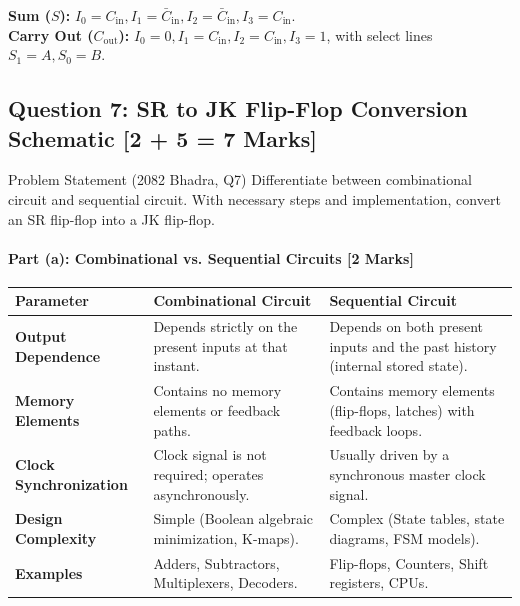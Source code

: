 \documentclass[11pt,a4paper,oneside]{book}
\begin{document}
\begin{answerbox}
\textbf{Sum ($S$):} $I_0 = C_{\text{in}}, I_1 = \bar{C}_{\text{in}}, I_2 = \bar{C}_{\text{in}}, I_3 = C_{\text{in}}$.\\
\textbf{Carry Out ($C_{\text{out}}$):} $I_0 = 0, I_1 = C_{\text{in}}, I_2 = C_{\text{in}}, I_3 = 1$, with select lines $S_1 = A, S_0 = B$.
\end{answerbox}

\vspace{0.6cm}

\subsection{Question 7: SR to JK Flip-Flop Conversion Schematic [2 + 5 = 7 Marks]}
\begin{questionbox}{Problem Statement (2082 Bhadra, Q7)}
Differentiate between combinational circuit and sequential circuit. With necessary steps and implementation, convert an SR flip-flop into a JK flip-flop.
\end{questionbox}

\paragraph{Part (a): Combinational vs. Sequential Circuits [2 Marks]}
\begin{center}
\small
\begin{tabular}{@{}p{3.2cm}p{6.8cm}p{6.8cm}@{}}
\toprule
\textbf{Parameter} & \textbf{Combinational Circuit} & \textbf{Sequential Circuit} \\
\midrule
\textbf{Output Dependence} & Depends strictly on the present inputs at that instant. & Depends on both present inputs and the past history (internal stored state). \\
\textbf{Memory Elements} & Contains no memory elements or feedback paths. & Contains memory elements (flip-flops, latches) with feedback loops. \\
\textbf{Clock Synchronization} & Clock signal is not required; operates asynchronously. & Usually driven by a synchronous master clock signal. \\
\textbf{Design Complexity} & Simple (Boolean algebraic minimization, K-maps). & Complex (State tables, state diagrams, FSM models). \\
\textbf{Examples} & Adders, Subtractors, Multiplexers, Decoders. & Flip-flops, Counters, Shift registers, CPUs. \\
\bottomrule
\end{tabular}
\end{center}
\end{document}
